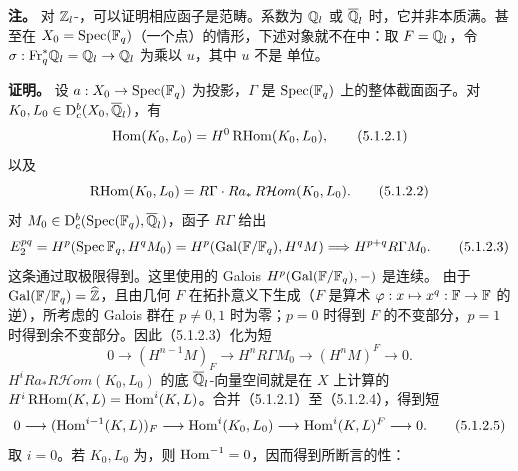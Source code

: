 \par\noindent\textbf{注。} 对 $\mathbb Z_l$-，可以证明相应函子是范畴。系数为 $\mathbb Q_l$ 或 $\overline{\mathbb Q}_l$ 时，它并非本质满。甚至在 $X_0=\operatorname{Spec}(\mathbb F_q)$（一个点）的情形，下述对象就不在中：取 $F=\mathbb Q_l$，令 $\sigma:\mathrm{Fr}_q^*\mathbb Q_l=\mathbb Q_l\to\mathbb Q_l$ 为乘以 $u$，其中 $u$ 不是 单位。

\par\noindent\textbf{证明。} 设 $a:X_0\to\operatorname{Spec}(\mathbb F_q)$ 为投影，$\Gamma$ 是 $\operatorname{Spec}(\mathbb F_q)$ 上的整体截面函子。对 $K_0,L_0\in\mathrm{D}_c^b(X_0,\overline{\mathbb Q}_l)$，有
\begin{equation*}
\operatorname{Hom}(K_0,L_0)=H^0\operatorname{RHom}(K_0,L_0),\tag{5.1.2.1}
\end{equation*}
以及
\begin{equation*}
\operatorname{RHom}(K_0,L_0)=R\Gamma\cdot Ra_*\,R\mathcal Hom(K_0,L_0).\tag{5.1.2.2}
\end{equation*}
对 $M_0\in\mathrm{D}_c^b(\operatorname{Spec}(\mathbb F_q),\overline{\mathbb Q}_l)$，函子 $R\Gamma$ 给出
\begin{equation*}
E_2^{pq}=H^p(\operatorname{Spec}\mathbb F_q,H^qM_0)
=H^p(\operatorname{Gal}(\mathbb F/\mathbb F_q),H^qM)
\Longrightarrow H^{p+q}R\Gamma M_0.\tag{5.1.2.3}
\end{equation*}
这条通过取极限得到。这里使用的 Galois  $H^p(\operatorname{Gal}(\mathbb F/\mathbb F_q),-)$ 是连续。
由于 $\operatorname{Gal}(\mathbb F/\mathbb F_q)=\widehat{\mathbb Z}$，且由几何  $F$ 在拓扑意义下生成（$F$ 是算术  $\varphi:x\mapsto x^q:\mathbb F\to\mathbb F$ 的逆），所考虑的 Galois 群在 $p\ne0,1$ 时为零；$p=0$ 时得到 $F$ 的不变部分，$p=1$ 时得到余不变部分。因此（5.1.2.3）化为短
\begin{equation*}
0\longrightarrow(H^{n-1}M)_F\longrightarrow H^nR\Gamma M_0\longrightarrow(H^nM)^F\longrightarrow0.\tag{5.1.2.4}
\end{equation*}
$H^iRa_*R\mathcal Hom(K_0,L_0)$ 的底 $\overline{\mathbb Q}_l$-向量空间就是在 $X$ 上计算的 $H^i\operatorname{RHom}(K,L)=\operatorname{Hom}^i(K,L)$。合并（5.1.2.1）至（5.1.2.4），得到短
\begin{equation*}
0\longrightarrow(\operatorname{Hom}^{i-1}(K,L))_F\longrightarrow\operatorname{Hom}^i(K_0,L_0)\longrightarrow\operatorname{Hom}^i(K,L)^F\longrightarrow0.\tag{5.1.2.5}
\end{equation*}
取 $i=0$。若 $K_0,L_0$ 为，则 $\operatorname{Hom}^{-1}=0$，因而得到所断言的性：
